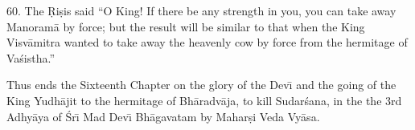 60. The \d{R}i\d{s}is said ``O King! If there be any strength in you, you can take away Manoram\=a by force; but the result will be similar to that when the King Visv\=amitra wanted to take away the heavenly cow by force from the hermitage of Va\'sistha.''

Thus ends the Sixteenth Chapter on the glory of the Dev\={\i} and the going of the King Yudh\=ajit to the hermitage of Bh\=aradv\=aja, to kill Sudar\'sana, in the the 3rd Adhy\=aya of \'Sr\={\i} Mad Dev\={\i} Bh\=agavatam by Mahar\d{s}i Veda Vy\=asa.



